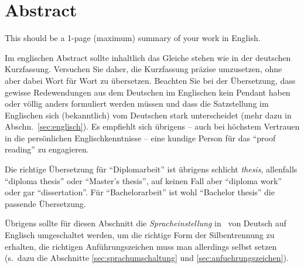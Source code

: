 \chapter{Abstract}

\begin{english} %
This should be a 1-page (maximum) summary of your work in English.
\end{english}

Im englischen Abstract sollte inhaltlich das Gleiche
stehen wie in der deutschen Kurzfassung. Versuchen Sie daher, die
Kurzfassung prä\-zise umzusetzen, ohne aber dabei Wort für Wort zu
übersetzen. Beachten Sie bei der Übersetzung, dass gewisse
Redewendungen aus dem Deutschen im Englischen kein Pendant haben
oder völlig anders formuliert werden müssen und dass die
Satzstellung im Englischen sich (bekanntlich) vom Deutschen stark
unterscheidet (mehr dazu in Abschn.\ \ref{sec:englisch}). Es
empfiehlt sich übrigens -- auch bei höchstem Vertrauen in die
persönlichen Englischkenntnisse -- eine kundige Person für das
"`proof reading"' zu engagieren.

Die richtige Übersetzung für "`Diplomarbeit"' ist übrigens
schlicht \emph{thesis}, allenfalls  "`diploma thesis"' oder "`Master's thesis"', 
auf keinen Fall aber "`diploma work"' oder gar "`dissertation"'. 
Für "`Bachelorarbeit"' ist wohl "`Bachelor thesis"' die passende Übersetzung. 

Übrigens sollte für diesen Abschnitt die \emph{Spracheinstellung} in \latex\ von Deutsch
auf Englisch umgeschaltet werden, um die richtige Form der
Silbentrennung zu erhalten, die richtigen Anführungszeichen muss
man allerdings selbst setzen %
(s.\ dazu die Abschnitte \ref{sec:sprachumschaltung} %
und \ref{sec:anfuehrungszeichen}).
